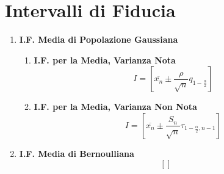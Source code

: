 \documentclass{article}
\begin{document}
\section{Intervalli di Fiducia}

\begin{enumerate}
    \item \textbf{I.F. Media di Popolazione Gaussiana}
    \begin{enumerate}
        \item \textbf{I.F. per la Media, Varianza Nota}
        \[ \boxed{I = \left[ \overline{x_n} \pm \frac{\rho}{\sqrt{n}}q_{1 - \frac{\alpha}{2}} \right]} \]
        \item \textbf{I.F. per la Media, Varianza Non Nota}
        \[ \boxed{I = \left[ \overline{x_n} \pm \frac{S_n}{\sqrt{n}}\tau_{1-\frac{\alpha}{2}, n - 1} \right] } \]
    \end{enumerate}
    \item \textbf{I.F. Media di Bernoulliana}
    \[ \left[ \right] \]
\end{enumerate}

\newpage

\end{document}
